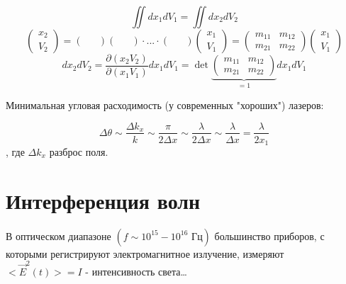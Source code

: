 \documentclass[12pt, a4paper]{report}
\begin{document}
\begin{theorem}
    \[ \iint d x_1 d V_1 = \iint d x_2 d V_2  \] 
    \[\begin{pmatrix}
    x_2\\
    V_2
    \end{pmatrix} = \begin{pmatrix}
    &\\
    &
    \end{pmatrix} 
    \begin{pmatrix}
        &\\
        &
    \end{pmatrix} \cdot ... \cdot 
    \begin{pmatrix}
        &\\
        &
    \end{pmatrix}
    \begin{pmatrix}
        x_1\\
        V_1
    \end{pmatrix} =\begin{pmatrix}
    m_{11}  & m_{12}\\
    m_{21}& m_{22} 
    \end{pmatrix} 
    \begin{pmatrix}
        x_1\\
        V_1
    \end{pmatrix}    \] 
    \[ d x_2 d V_2  = \frac{\partial  (x_2 V_2 )}{\partial (x_1  V_1 )} d x_1 d V_1 = \det \underbrace{\begin{pmatrix}
        m_{11}  & m_{12}\\
        m_{21}& m_{22}
    \end{pmatrix} }_{= 1} d x_1 d V_1 \] 
\end{theorem} 

Минимальная угловая расходимость (у современных "хороших") лазеров: 

\[ \Delta \theta \sim \frac{\Delta k_x}{k } \sim  \frac{\pi}{2 \Delta x } \sim  \frac{ \lambda }{2 \Delta x } \sim \frac{\lambda }{\Delta x } = \frac{\lambda }{2 x_1 }      \] 
, где \( \Delta k_x \)  разброс поля.

\section{Интерференция волн}

В оптическом диапазоне \( (f \sim  10 ^{15 }  - 10 ^{16 } \text{ Гц} ) \) большинство приборов, с которыми регистрируют электромагнитное излучение, измеряют \( <\vec{E } ^2 (t)> = I \) - интенсивность света\dots
\end{document}
